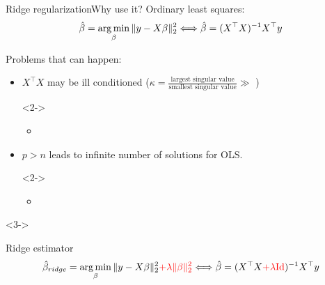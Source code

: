 \documentclass[10pt,aspectratio=43]{beamer}
\begin{document}
\begin{frame}{Ridge regularization}{Why use it?}
    Ordinary least squares:
    \[\hat\beta = \mathop{\mathrm{arg\,min}}_{\beta} \|y-X\beta\|_2^2 \Longleftrightarrow \hat \beta = (X^\top X)^{-1}X^\top y\]

    Problems that can happen:
    \begin{itemize}
        \item $X^\top X$ may be ill conditioned ($\kappa = \frac{\text{largest singular value}}{\text{smallest singular value}} \gg $ )
        \begin{onlyenv}<2->
            \begin{itemize}
                \item {}
            \end{itemize}
        \end{onlyenv}
        \item $p > n$ leads to infinite number of solutions for OLS.
        \begin{onlyenv}<2->
            \begin{itemize}
                \item \color{red}{ Add penalty to recover unicity.}
            \end{itemize}
        \end{onlyenv}
    \end{itemize}
    \begin{onlyenv}<3->
    \begin{block}{Ridge estimator}
        \[ \hat\beta_{ridge} = \mathop{\mathrm{arg\,min}}_{\beta} \|y-X\beta\|_2^2 \textcolor{red}{+ \lambda \|\beta\|^2_2} \Longleftrightarrow \hat \beta = (X^\top X \textcolor{red}{+ \lambda \mathrm{Id}})^{-1}X^\top y \]
    \end{block}
    \end{onlyenv}
\end{frame}

\end{document}
